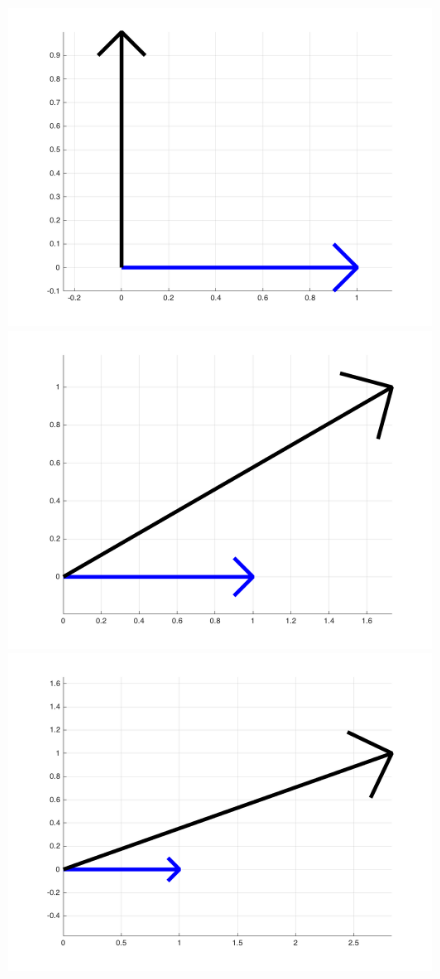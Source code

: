 \begin{figure}[h]
	\begin{minipage}{.3\textwidth}
		\includegraphics[width=\linewidth]{./images/vector_a.png}
	\end{minipage}
	\begin{minipage}{.3\textwidth}
		\includegraphics[width=\linewidth]{./images/vector_b.png}
	\end{minipage}
	\begin{minipage}{.3\textwidth}
		\includegraphics[width=\linewidth]{./images/vector_c.png}

\end{minipage}
\end{figure}
